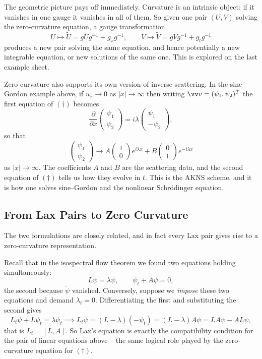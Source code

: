The geometric picture pays off immediately. Curvature is an intrinsic object: if it vanishes in one gauge it vanishes in all of them. So given one pair $(U, V)$ solving the zero-curvature equation, a gauge transformation
$$
U\mapsto \tilde U = gUg^{-1} + g_xg^{-1}, \qquad V\mapsto\tilde V = gVg^{-1} + g_tg^{-1}
$$
produces a new pair solving the same equation, and hence potentially a new integrable equation, or new solutions of the same one. This is explored on the last example sheet.

Zero curvature also supports its own version of inverse scattering. In the sine--Gordon example above, if $u_x\to0$ as $|x|\to\infty$ then writing $\vv v = (\psi_1,\psi_2)^T$ the first equation of $(\dagger)$ becomes
$$
\frac{\partial}{\partial x}\begin{pmatrix}\psi_1\\\psi_2\end{pmatrix} = i\lambda\begin{pmatrix}\psi_1\\-\psi_2\end{pmatrix},
$$
so that
$$
\begin{pmatrix}\psi_1\\\psi_2\end{pmatrix}\to A\begin{pmatrix}1\\0\end{pmatrix}e^{i\lambda x} + B\begin{pmatrix}0\\1\end{pmatrix}e^{-i\lambda x}
$$
as $|x|\to\infty$. The coefficients $A$ and $B$ are the scattering data, and the second equation of $(\dagger)$ tells us how they evolve in $t$. This is the AKNS scheme, and it is how one solves sine--Gordon and the nonlinear Schr\"odinger equation.

\subsection{From Lax Pairs to Zero Curvature}

The two formulations are closely related, and in fact every Lax pair gives rise to a zero-curvature representation.

Recall that in the isospectral flow theorem we found two equations holding simultaneously:
$$
L\psi = \lambda\psi, \qquad \psi_t + A\psi = 0,
$$
the second because $\tilde\psi$ vanished. Conversely, suppose we \emph{impose} these two equations and demand $\lambda_t = 0$. Differentiating the first and substituting the second gives
$$
L_t\psi + L\psi_t = \lambda\psi_t \implies L_t\psi = (L - \lambda)(-\psi_t) = (L-\lambda)A\psi = LA\psi - AL\psi,
$$
that is $L_t = [L,A]$. So Lax's equation is exactly the compatibility condition for the pair of linear equations above -- the same logical role played by the zero-curvature equation for $(\dagger)$.

